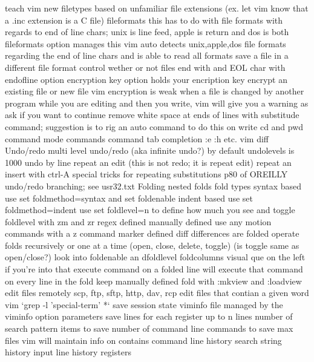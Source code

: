 \documentclass[12pt]{book}
\begin{document}
{    teach vim new filetypes based on unfamiliar file extensions (ex. let vim know that a .inc extension is a C file)
    fileformats
      this has to do with file formats with regards to end of line chars; unix is line feed, apple is return and dos is both
      fileformats option manages this
      vim auto detects unix,apple,dos file formats regarding the end of line chars and is able to read all formats
      save a file in a different file format
    control wether or not files end with and EOL char with endofline option
    encryption
      key option holds your encription key
      encrypt an existing file or new file
      vim encryption is weak
    when a file is changed by another program while you are editing and then you write, vim will give you a warning as ask if you want to continue
    remove white space at ends of lines with substitude command; suggestion is to rig an auto command to do this on write
    cd and pwd command mode commands
  command tab completion :e :h etc.
  vim diff
  Undo/redo
    multi level undo/redo (aka infinite undo?)
      by default undolevels is 1000
    undo by line
    repeat an edit (this is not redo; it is repeat edit)
    repeat an insert with ctrl-A
    special tricks for repeating substitutions p80 of OREILLY
    undo/redo branching; see usr32.txt
  Folding
    nested folds
    fold types
      syntax based
        use set foldmethod=syntax and set foldenable
      indent based
        use set foldmethod=indent
        use set foldlevel=n to define how much you see and toggle foldlevel with zm and zr
      regex defined
      manually defined
        use any motion commands with a z command
      marker defined
      diff differences are folded
    operate folds recursively or one at a time (open, close, delete, toggle) (is toggle same as open/close?)
    look into foldenable an dfoldlevel
    foldcolumns visual que on the left if you're into that
    execute command on a folded line will execute that command on every line in the fold
    keep manually defined fold with :mkview and :loadview
  edit files remotely
    scp, ftp, sftp, http, dav, rcp
  edit files that contian a given word
    vim `grep -l 'special-term' *`
  save session state
    viminfo file
      managed by the viminfo option parameters
        save lines for each register up to n lines
        number of search pattern items to save
        number of command line commands to save
        max files vim will maintain info on
      contains
        command line history
        search string history
        input line history
        registers
}
\end{document}
